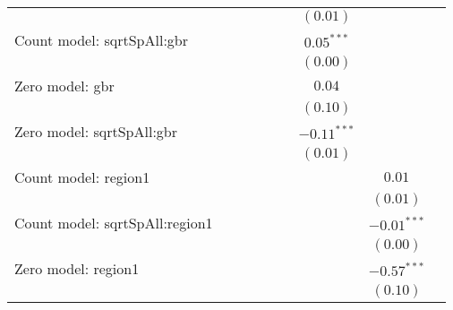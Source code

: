 \begin{sidewaystable}
\begin{center}
{\begin{tabular}{l c c c c c c c c}
                               &               &               &                &               &                & $(0.01)$      &                 &                 \\
Count model: sqrtSpAll:gbr     &               &               &                &               &                & $0.05^{***}$  &                 &                 \\
                               &               &               &                &               &                & $(0.00)$      &                 &                 \\
Zero model: gbr                &               &               &                &               &                & $0.04$        &                 &                 \\
                               &               &               &                &               &                & $(0.10)$      &                 &                 \\
Zero model: sqrtSpAll:gbr      &               &               &                &               &                & $-0.11^{***}$ &                 &                 \\
                               &               &               &                &               &                & $(0.01)$      &                 &                 \\
Count model: region1           &               &               &                &               &                &               & $0.01$          &                 \\
                               &               &               &                &               &                &               & $(0.01)$        &                 \\
Count model: sqrtSpAll:region1 &               &               &                &               &                &               & $-0.01^{***}$   &                 \\
                               &               &               &                &               &                &               & $(0.00)$        &                 \\
Zero model: region1            &               &               &                &               &                &               & $-0.57^{***}$   &                 \\
                               &               &               &                &               &                &               & $(0.10)$        &                 \\

\end{tabular}}
\end{center}
\end{sidewaystable}
